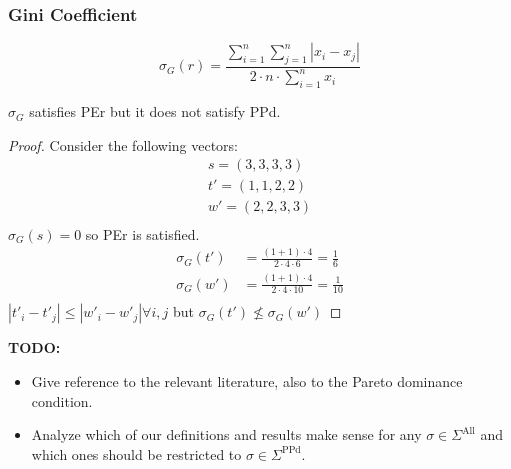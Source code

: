 \documentclass[version=3.21, pagesize, notitlepage, twoside=off, bibliography=totoc, DIV=calc, fontsize=12pt, a4paper]{scrartcl}
\newcommand{\SPPd}{\Sigma^\text{PPd}}
\newcommand{\SAll}{\Sigma^\text{All}}
\begin{document}
\subsubsection{Gini Coefficient}
\[\sigma_{G}(r)= \frac{\sum_{i=1}^{n}\sum_{j=1}^{n}|x_i-x_j|}{2 \cdot n \cdot \sum_{i=1}^{n} x_i}\]
\begin{proposition}
	$\sigma_{G}$ satisfies PEr but it does not satisfy PPd.
\end{proposition}
\begin{proof}
	Consider the following vectors:
	\begin{align}
		s=(3,3,3,3) \\
		t'=(1,1,2,2) \\
		w'=(2,2,3,3) \\
	\end{align}
	$\sigma_{G}(s)=0$ so PEr is satisfied. 
	\begin{align}
		\sigma_{G}(t') &= \frac{(1+1)\cdot 4}{2 \cdot 4 \cdot 6}=\frac{1}{6} \\
		\sigma_{G}(w') &= \frac{(1+1)\cdot 4}{2 \cdot 4 \cdot 10}=\frac{1}{10} \\
	\end{align}
	$|t'_{i}-t'_{j}| \leq |w'_{i}-w'_{j}| \forall i, j$ but $\sigma_{G}(t') \nleq \sigma_{G}(w')$
\end{proof}

\textbf{TODO: }
\begin{itemize}
	\item Give reference to the relevant literature, also to the Pareto dominance condition.
	\item Analyze which of our definitions and results make sense for any $\sigma \in \SAll$ and which ones should be restricted to $\sigma \in \SPPd$.
\end{itemize}
\end{document}
